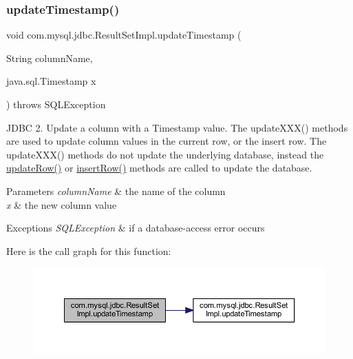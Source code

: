 \subsubsection{\texorpdfstring{update\+Timestamp()}{updateTimestamp()}\hspace{0.1cm}{\footnotesize\ttfamily [2/2]}}
{\footnotesize\ttfamily void com.\+mysql.\+jdbc.\+Result\+Set\+Impl.\+update\+Timestamp (\begin{DoxyParamCaption}\item[{String}]{column\+Name,  }\item[{java.\+sql.\+Timestamp}]{x }\end{DoxyParamCaption}) throws S\+Q\+L\+Exception}

J\+D\+BC 2. Update a column with a Timestamp value. The update\+X\+X\+X() methods are used to update column values in the current row, or the insert row. The update\+X\+X\+X() methods do not update the underlying database, instead the \mbox{\hyperlink{classcom_1_1mysql_1_1jdbc_1_1_result_set_impl_a2842d32292d023aaeeafedeed3322981}{update\+Row()}} or \mbox{\hyperlink{classcom_1_1mysql_1_1jdbc_1_1_result_set_impl_a78e304e3279cbcf60392f18c1385e3bf}{insert\+Row()}} methods are called to update the database.


\begin{DoxyParams}{Parameters}
{\em column\+Name} & the name of the column \\
\hline
{\em x} & the new column value\\
\hline
\end{DoxyParams}

\begin{DoxyExceptions}{Exceptions}
{\em S\+Q\+L\+Exception} & if a database-\/access error occurs \\
\hline
\end{DoxyExceptions}
Here is the call graph for this function\+:
\nopagebreak
\begin{figure}[H]
\begin{center}
\leavevmode
\includegraphics[width=350pt]{classcom_1_1mysql_1_1jdbc_1_1_result_set_impl_a7934518ed2f8bbfee20a5b4a5a0cdcd0_cgraph}
\end{center}
\end{figure}
\mbox{\label{classcom_1_1mysql_1_1jdbc_1_1_result_set_impl_a05e363f39a9bfbb27736d2b90df9ae99}} 
